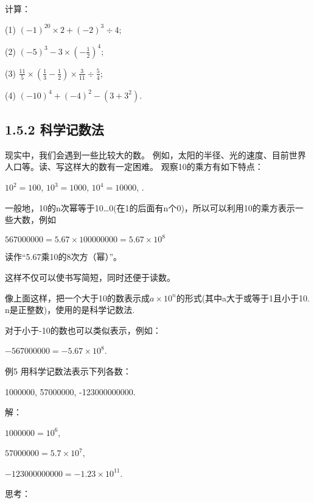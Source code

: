 \documentclass{article}
\begin{document}
\begin{example}
\begin{exercise}
    计算：

    (1) $(-1)^{20}\times2+(-2)^3\div4$;

    (2) $ (-5)^3-3\times(-\frac{1}{2})^4$;

    (3) $ \frac{11}{5}\times(\frac{1}{3}-\frac{1}{2})\times\frac{3}{11}\div\frac{5}{4}$;
    
    (4) $ (-10)^4+(-4)^2-(3+3^2) $.
\end{exercise}

\subsection*{1.5.2 科学记数法}

现实中，我们会遇到一些比较大的数。 例如，太阳的半径、光的速度、目前世界人口等。读、写这样大的数有一定困难。
观察10的乘方有如下特点：

{$10^2=100$, $ 10^3=1000 $, $ 10^4=10000 $, \cdots.}

一般地，10的n次幂等于10\dots 0(在1的后面有n个0)，所以可以利用10的乘方表示一些大数，例如

$567000000=5.67\times100000000=5.67\times10^{8}$

读作“5.67乘10的8次方（幂）”。

这样不仅可以使书写简短，同时还便于读数。

\begin{definition}

像上面这样，把一个大于10的数表示成$a\times10^{n}$的形式(其中a大于或等于1且小于10. n是正整数)，使用的是科学记数法.

\end{definition}   

对于小于-10的数也可以类似表示，例如：

$ -567000000=-5.67\times10^{8} $.

\begin{example}

例5 用科学记数法表示下列各数：

1000000, 57000000, -123000000000.

解：

$1000000=10^{6}$,

$ 57000000=5.7\times10^{7} $,

$ -123000000000=-1.23\times10^{11} $.

\end{example}

\begin{exercise}
思考：


\end{exercise}
\end{example}
\end{document}
